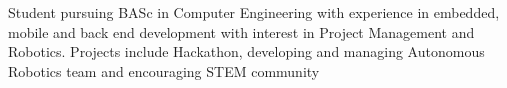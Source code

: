 

\begin{cvparagraph}

Student pursuing BASc in Computer Engineering with experience in embedded, mobile and back end development with interest in Project Management and Robotics. Projects include  Hackathon, developing and managing Autonomous Robotics team and encouraging STEM community
\end{cvparagraph}
